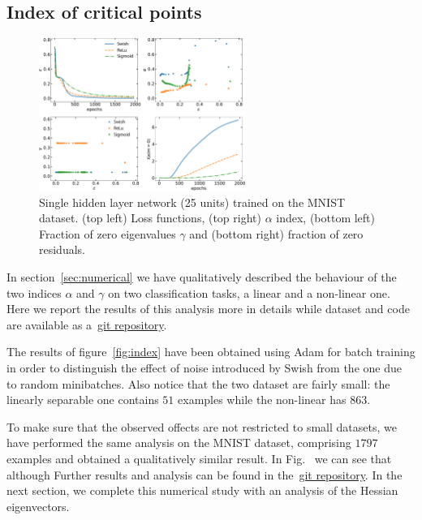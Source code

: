 \documentclass{article}
\begin{document}
\subsection{Index of critical points} \label{a:numerical}
%
\begin{figure}[t!]
\centering
	\includegraphics[width= 0.6\textwidth]{mnist.pdf}
\caption{ \label{fig:mnist} Single hidden layer network (25 units) trained on the MNIST dataset. (top left) Loss functions, (top right) $\alpha$ index, (bottom left) Fraction of zero eigenvalues $\gamma$ and (bottom right) fraction of zero residuals.}
\end{figure}
%
In section~\eqref{sec:numerical} we have qualitatively described the behaviour of the two indices $\alpha$ and $\gamma$ on two classification tasks, a linear and a non-linear one. Here we report the results of this analysis more in details while dataset and code are available as a~\href{https://github.com/WessZumino/meanfield-theory-of-activation-functions}{git repository}.

The results of figure~\eqref{fig:index} have been obtained using Adam for batch training in order to distinguish the effect of noise introduced by Swish from the one due to random minibatches. Also notice that the two dataset are fairly small: the linearly separable one contains $51$ examples while the non-linear has $863$.

To make sure that the observed offects are not restricted to small datasets, we have performed the same analysis on the MNIST dataset, comprising $1797$ examples and obtained a qualitatively similar result.
In Fig.~ we can see that although Further results and analysis can be found in the~\href{https://github.com/WessZumino/meanfield-theory-of-activation-functions}{git repository}. In the next section, we complete this numerical study with an analysis of the Hessian eigenvectors.
%
\end{document}
